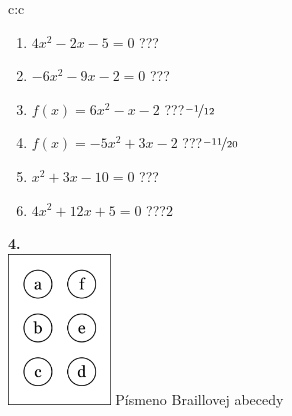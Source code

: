 \documentclass[10pt]{report}
\begin{document}
\begin{tabular}{c:c}
\begin{minipage}[c][104.5mm][t]{0.5\linewidth}
\begin{center}
\begin{minipage}{0.79\linewidth}
\begin{center}
\begin{varwidth}{\linewidth}
\begin{enumerate}
\Large
\item $4x^2-2x-5=0$\quad \dotfill\; ???\;\dotfill {}
\item $-6x^2-9x-2=0$\quad \dotfill\; ???\;\dotfill {}
\item $f(x)=6x^2-x-2$\quad \dotfill\; ???\;\dotfill \quad $\nicefrac{-1}{12}$
\item $f(x)=-5x^2+3x-2$\quad \dotfill\; ???\;\dotfill \quad $\nicefrac{-11}{20}$
\item $x^2+3x-10=0$\quad \dotfill\; ???\;\dotfill {}
\item $4x^2+12x+5=0$\quad \dotfill\; ???\;\dotfill \quad $2$
\end{enumerate}
\end{varwidth}
\end{center}
\end{minipage}
\begin{minipage}{0.20\linewidth}
\begin{center}
{\Huge\bfseries 4.} \\[2mm]
\includegraphics[height=40mm]{../images/braille.png}
{\small Písmeno Braillovej abecedy}
\end{center}
\end{minipage}
\end{center}
\end{minipage}
%
\end{tabular}
\newpage
\thispagestyle{empty}
\end{document}
